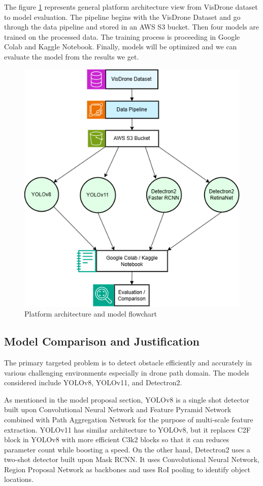 \documentclass[stu,12pt,floatsintext]{apa7}
\begin{document}
The figure \ref{fig:mlFlowchart} represents general platform architecture view from VisDrone dataset to model evaluation. The pipeline begins with the VisDrone Dataset and go through the data pipeline and stored in an AWS S3 bucket. Then four models are trained on the processed data. The training process is proceeding in Google Colab and Kaggle Notebook. Finally, models will be optimized and we can evaluate the model from the results we get. 

\begin{figure}[!htb]
    \centering
    \includegraphics[width=0.6\linewidth]{images/modelsupportDiagram.png}
    \caption{Platform architecture and model flowchart}
    \label{fig:mlFlowchart}
\end{figure}


\subsection{Model Comparison and Justification}

The primary targeted problem is to detect obstacle efficiently and accurately in various challenging environments especially in drone path domain. The models considered include YOLOv8, YOLOv11, and Detectron2.

As mentioned in the model proposal section, YOLOv8 is a single shot detector built upon Convolutional Neural Network and Feature Pyramid Network combined with Path Aggregation Network for the purpose of multi-scale feature extraction. YOLOv11 has similar architecture to YOLOv8, but it replaces C2F block in YOLOv8 with more efficient C3k2 blocks so that it can reduces parameter count while boosting a speed. On the other hand, Detectron2 uses a two-shot detector built upon Mask RCNN. It uses Convolutional Neural Network, Region Proposal Network as backbones and uses RoI pooling to identify object locations.
\end{document}
